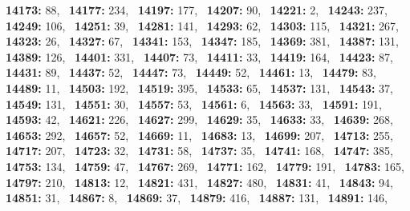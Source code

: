 \textbf{14173:} 88,\allowbreak~ 
\textbf{14177:} 234,\allowbreak~ 
\textbf{14197:} 177,\allowbreak~ 
\textbf{14207:} 90,\allowbreak~ 
\textbf{14221:} 2,\allowbreak~ 
\textbf{14243:} 237,\allowbreak~ 
\textbf{14249:} 106,\allowbreak~ 
\textbf{14251:} 39,\allowbreak~ 
\textbf{14281:} 141,\allowbreak~ 
\textbf{14293:} 62,\allowbreak~ 
\textbf{14303:} 115,\allowbreak~ 
\textbf{14321:} 267,\allowbreak~ 
\textbf{14323:} 26,\allowbreak~ 
\textbf{14327:} 67,\allowbreak~ 
\textbf{14341:} 153,\allowbreak~ 
\textbf{14347:} 185,\allowbreak~ 
\textbf{14369:} 381,\allowbreak~ 
\textbf{14387:} 131,\allowbreak~ 
\textbf{14389:} 126,\allowbreak~ 
\textbf{14401:} 331,\allowbreak~ 
\textbf{14407:} 73,\allowbreak~ 
\textbf{14411:} 33,\allowbreak~ 
\textbf{14419:} 164,\allowbreak~ 
\textbf{14423:} 87,\allowbreak~ 
\textbf{14431:} 89,\allowbreak~ 
\textbf{14437:} 52,\allowbreak~ 
\textbf{14447:} 73,\allowbreak~ 
\textbf{14449:} 52,\allowbreak~ 
\textbf{14461:} 13,\allowbreak~ 
\textbf{14479:} 83,\allowbreak~ 
\textbf{14489:} 11,\allowbreak~ 
\textbf{14503:} 192,\allowbreak~ 
\textbf{14519:} 395,\allowbreak~ 
\textbf{14533:} 65,\allowbreak~ 
\textbf{14537:} 131,\allowbreak~ 
\textbf{14543:} 37,\allowbreak~ 
\textbf{14549:} 131,\allowbreak~ 
\textbf{14551:} 30,\allowbreak~ 
\textbf{14557:} 53,\allowbreak~ 
\textbf{14561:} 6,\allowbreak~ 
\textbf{14563:} 33,\allowbreak~ 
\textbf{14591:} 191,\allowbreak~ 
\textbf{14593:} 42,\allowbreak~ 
\textbf{14621:} 226,\allowbreak~ 
\textbf{14627:} 299,\allowbreak~ 
\textbf{14629:} 35,\allowbreak~ 
\textbf{14633:} 33,\allowbreak~ 
\textbf{14639:} 268,\allowbreak~ 
\textbf{14653:} 292,\allowbreak~ 
\textbf{14657:} 52,\allowbreak~ 
\textbf{14669:} 11,\allowbreak~ 
\textbf{14683:} 13,\allowbreak~ 
\textbf{14699:} 207,\allowbreak~ 
\textbf{14713:} 255,\allowbreak~ 
\textbf{14717:} 207,\allowbreak~ 
\textbf{14723:} 32,\allowbreak~ 
\textbf{14731:} 58,\allowbreak~ 
\textbf{14737:} 35,\allowbreak~ 
\textbf{14741:} 168,\allowbreak~ 
\textbf{14747:} 385,\allowbreak~ 
\textbf{14753:} 134,\allowbreak~ 
\textbf{14759:} 47,\allowbreak~ 
\textbf{14767:} 269,\allowbreak~ 
\textbf{14771:} 162,\allowbreak~ 
\textbf{14779:} 191,\allowbreak~ 
\textbf{14783:} 165,\allowbreak~ 
\textbf{14797:} 210,\allowbreak~ 
\textbf{14813:} 12,\allowbreak~ 
\textbf{14821:} 431,\allowbreak~ 
\textbf{14827:} 480,\allowbreak~ 
\textbf{14831:} 41,\allowbreak~ 
\textbf{14843:} 94,\allowbreak~ 
\textbf{14851:} 31,\allowbreak~ 
\textbf{14867:} 8,\allowbreak~ 
\textbf{14869:} 37,\allowbreak~ 
\textbf{14879:} 416,\allowbreak~ 
\textbf{14887:} 131,\allowbreak~ 
\textbf{14891:} 146,\allowbreak~ 
